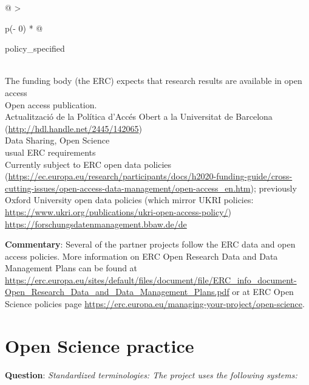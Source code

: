 \documentclass[
  12pt,
]{scrreprt}
\begin{document}
\begin{longtable}[]{@{}
  >{\raggedright\arraybackslash}p{(\columnwidth - 0\tabcolsep) * }@{}}
\toprule
\begin{minipage}[b]{\linewidth}\raggedright
policy\_specified
\end{minipage} \\
\midrule
\endhead
The funding body (the ERC) expects that research results are available
in open access \\
Open access publication. \\
Actualització de la Política d'Accés Obert a la Universitat de Barcelona
(\url{http://hdl.handle.net/2445/142065}) \\
Data Sharing, Open Science \\
usual ERC requirements \\
Currently subject to ERC open data policies
(\url{https://ec.europa.eu/research/participants/docs/h2020-funding-guide/cross-cutting-issues/open-access-data-management/open-access_en.htm});
previously Oxford University open data policies (which mirror UKRI
policies:
\url{https://www.ukri.org/publications/ukri-open-access-policy/}) \\
\url{https://forschungsdatenmanagement.bbaw.de/de} \\
\bottomrule
\end{longtable}

\textbf{Commentary}: Several of the partner projects follow the ERC data
and open access policies. More information on ERC Open Research Data and
Data Management Plans can be found at
\url{https://erc.europa.eu/sites/default/files/document/file/ERC_info_document-Open_Research_Data_and_Data_Management_Plans.pdf}
or at ERC Open Science policies page
\url{https://erc.europa.eu/managing-your-project/open-science}.

\hypertarget{open-science-practice}{%
\section{Open Science practice}\label{open-science-practice}}

\textbf{Question}: \emph{Standardized terminologies: The project uses
the following systems:}
\end{document}
